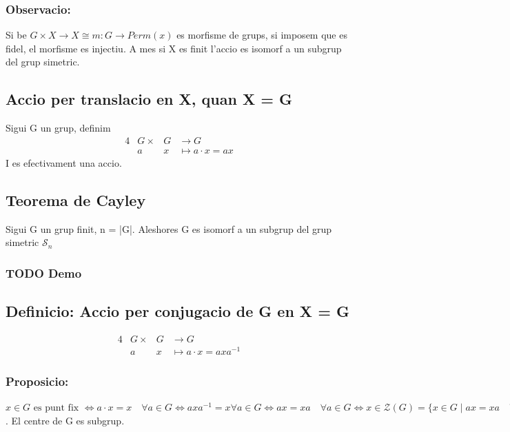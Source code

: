 \documentclass[11pt]{article}
\begin{document}
\subsubsection{Observacio:}
\label{sec:orgab1b845}
Si be \(G \times X \to X \cong m: G \to Perm(x)\) es morfisme de grups, si imposem que es fidel, el morfisme es injectiu. A mes si X es finit l'accio es isomorf a un subgrup del grup simetric.

\subsection{Accio per translacio en X, quan X = G}
\label{sec:orge6d9d26}
Sigui G un grup, definim
\begin{alignat*}{4}
&G \times &G &\to G \\
&a &x &\mapsto a \cdot x = ax
\end{alignat*}
I es efectivament una accio. 
\subsection{Teorema de Cayley}
\label{sec:org91dd616}
Sigui G un grup finit, n = |G|. Aleshores G es isomorf a un subgrup del grup simetric \(\mathcal{S}_n\)
\subsubsection{{\bfseries\sffamily TODO} Demo}
\label{sec:org2123c85}


\subsection{Definicio: Accio per conjugacio de G en X = G}
\label{sec:orgc0a3019}
\begin{alignat*}{4}
\label{eq:org26be6c1}
&G \times &G &\to G \\
&a &x &\mapsto a \cdot x = axa^{-1}
\end{alignat*}

\subsubsection{Proposicio:}
\label{sec:orgc06909c}

\(x \in G \text{ es punt fix } \iff a \cdot x = x \quad \forall a \in G \iff axa^{-1} = x \forall a \in G \iff ax = xa \quad \forall a \in G \iff x \in \mathcal{Z}(G) = \{ x \in G \mid ax = xa \quad \forall a \in G \} = \text{ centre de G}\). El centre de G es subgrup.
\end{document}
